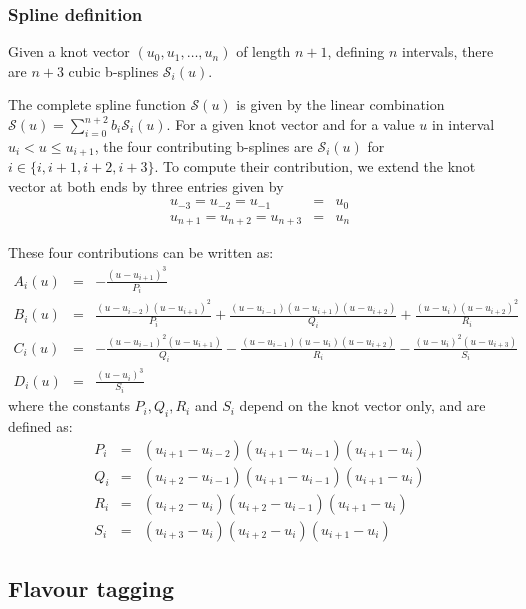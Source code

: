 \documentclass[a4paper,10pt,twosided]{article}
\begin{document}
\subsubsection{Spline definition}


Given a knot vector $(u_0,u_1,\dots,u_n)$ of length $n+1$, defining $n$ intervals, there are $n+3$ cubic b-splines $\mathcal{S}_i(u)$.

The complete spline function $ \mathcal{S}(u)$ is given by the linear combination $\mathcal{S}(u)= \sum_{i=0}^{n+2} b_i  \mathcal{S}_i(u)$.
For a given knot vector and for a value $u$ in interval $u_{i}<  u\le u_{i+1}$, the four contributing b-splines are $\mathcal{S}_i(u)$ for $i\in \{i,i+1,i+2,i+3\}$.
To compute their contribution, we extend the knot vector at both ends by three entries given by  
\begin{eqnarray*}
 u_{-3}=u_{-2}=u_{-1}&=&u_0
\\ u_{n+1}=u_{n+2}=u_{n+3}&=&u_n
\end{eqnarray*}


These
four contributions can be written as:
\begin{eqnarray*}
     A_i(u) &=& -\frac{(u-u_{i+1})^3}{P_i} 
\\   B_i(u) &=&  \frac{(u-u_{i-2})(u-u_{i+1})^2 }{P_i} + \frac{ (u-u_{i-1})(u-u_{i+1})(u-u_{i+2}) }{Q_i} + \frac{ (u-u_i)(u-u_{i+2})^2 }{R_i}
\\   C_i(u) &=& -\frac{(u-u_{i-1})^2(u-u_{i+1}) }{Q_i} - \frac{ (u-u_{i-1})(u-u_i )(u-u_{i+2}) }{R_i} - \frac{ (u-u_i)^2(u-u_{i+3}) }{S_i}
\\   D_i(u) &=&  \frac{(u-u_i)^3 }{S_i}
\end{eqnarray*}
where the constants $P_i,Q_i,R_i$ and $S_i$ depend on the knot vector only, and are defined as:
\begin{eqnarray*}
    P_i &=&(u_{i+1}-u_{i-2})(u_{i+1}-u_{i-1})(u_{i+1}-u_i)
\\  Q_i &=&(u_{i+2}-u_{i-1})(u_{i+1}-u_{i-1})(u_{i+1}-u_i)
\\  R_i &=&(u_{i+2}-u_{i  })(u_{i+2}-u_{i-1})(u_{i+1}-u_i)
\\  S_i &=&(u_{i+3}-u_{i  })(u_{i+2}-u_{i  })(u_{i+1}-u_i)
\end{eqnarray*}




\pagebreak
\subsection{Flavour tagging}
\end{document}
